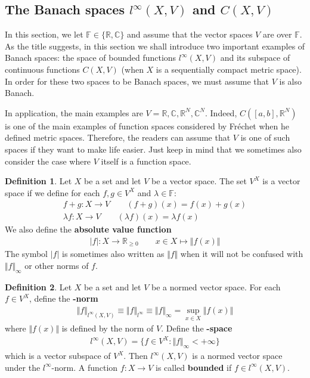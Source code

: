 \documentclass[12pt,b5paper,notitlepage]{article}
\theoremstyle{definition}
\newtheorem{df}{Definition}[section]
\theoremstyle{plain}
\newcommand{\Cbb}{\mathbb C}
\newcommand{\Rbb}{\mathbb R}
\newcommand{\Fbb}{\mathbb F}
\numberwithin{equation}{section}
\begin{document}
\subsection{The Banach spaces $l^\infty(X,V)$ and $C(X,V)$}


In this section, we let $\Fbb\in\{\Rbb,\Cbb\}$ and assume that the vector spaces $V$ are over $\Fbb$. As the title suggests, in this section we shall introduce two important examples of Banach spaces: the space of bounded functions $l^\infty(X,V)$ and its  subspace of continuous functions $C(X,V)$ (when $X$ is a sequentially compact metric space).  In order for these two spaces to be Banach spaces, we must assume that $V$ is also Banach. 

In application, the main examples are $V=\Rbb,\Cbb,\Rbb^N,\Cbb^N$. Indeed, $C([a,b],\Rbb^N)$ is one of the main examples of function spaces considered by Fr\'echet when he defined metric spaces. Therefore, the readers can assume that $V$ is one of such spaces if they want to make life easier. Just keep in mind that we sometimes also consider the case where $V$ itself is a function space.

\begin{df}\label{lb150}
Let $X$ be a set and let $V$ be a vector space. The set $V^X$  is a vector space if we define for each $f,g\in V^X$ and $\lambda\in\Fbb$:
\begin{gather*}
f+g:X\rightarrow V\qquad (f+g)(x)=f(x)+g(x)\\
\lambda f:X\rightarrow V\qquad (\lambda f)(x)=\lambda f(x)
\end{gather*}
We also define the \textbf{absolute value function} 
\begin{align}
|f|:X\rightarrow\Rbb_{\geq 0}\qquad x\in X\mapsto \Vert f(x)\Vert
\end{align}
The symbol $|f|$ is sometimes also written as $\Vert f\Vert$ when it will not be confused with $\Vert f\Vert_{\infty}$ or other norms of $f$.
\end{df}



\begin{df}
Let $X$ be a set and let $V$ be a normed vector space. For each $f\in V^X$, define the  \textbf{-norm}
\begin{align}
\Vert f\Vert_{l^\infty(X,V)}\equiv\Vert f\Vert_{l^\infty}\equiv \Vert f\Vert_\infty=\sup_{x\in X}\Vert f(x)\Vert
\end{align}
where $\Vert f(x)\Vert$ is defined by the norm of $V$. Define the \textbf{-space}  
\begin{align}
l^\infty(X,V)=\{f\in V^X:\Vert f\Vert_\infty<+\infty\}
\end{align}
which is a vector subspace of $V^X$. Then $l^\infty(X,V)$ is a normed vector space under the $l^\infty$-norm. A function $f:X\rightarrow V$ is called \textbf{bounded}  if $f\in l^\infty(X,V)$.
\end{df}
\end{document}
